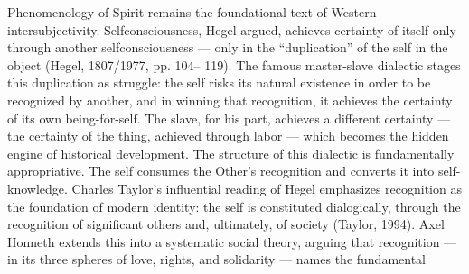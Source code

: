 Phenomenology of Spirit remains the foundational text of Western intersubjectivity. Selfconsciousness, Hegel argued, achieves certainty of itself only through another selfconsciousness — only in the “duplication” of the self in the object (Hegel, 1807/1977, pp. 104– 119). The famous master-slave dialectic stages this duplication as struggle: the self risks its natural existence in order to be recognized by another, and in winning that recognition, it achieves the certainty of its own being-for-self. The slave, for his part, achieves a different certainty — the certainty of the thing, achieved through labor — which becomes the hidden engine of historical development. The structure of this dialectic is fundamentally appropriative. The self consumes the Other’s recognition and converts it into self-knowledge. Charles Taylor’s influential reading of Hegel emphasizes recognition as the foundation of modern identity: the self is constituted dialogically, through the recognition of significant others and, ultimately, of society (Taylor, 1994). Axel Honneth extends this into a systematic social theory, arguing that recognition — in its three spheres of love, rights, and solidarity — names the fundamental

